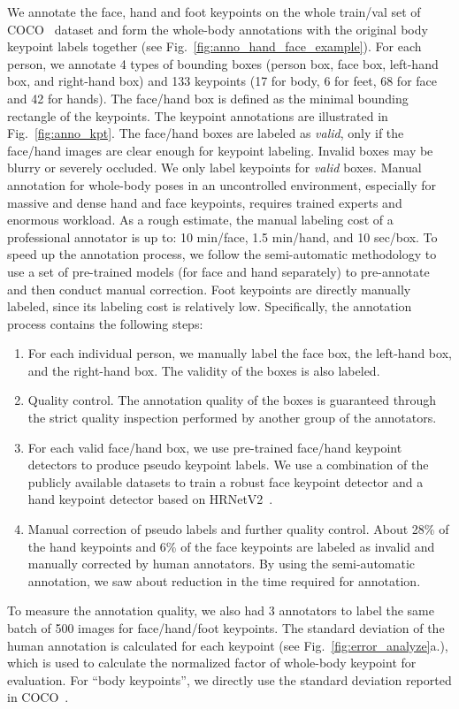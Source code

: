 \documentclass[runningheads]{llncs}
\begin{document}
	We annotate the face, hand and foot keypoints on the whole train/val set of COCO~\cite{lin2014microsoft} dataset and form the whole-body annotations with the original body keypoint labels together (see Fig.~\ref{fig:anno_hand_face_example}). For each person, we annotate 4 types of bounding boxes (person box, face box, left-hand box, and right-hand box) and 133 keypoints (17 for body, 6 for feet, 68 for face and 42 for hands). The face/hand box is defined as the minimal bounding rectangle of the keypoints. The keypoint annotations are illustrated in Fig.~\ref{fig:anno_kpt}. The face/hand boxes are labeled as \emph{valid}, only if the face/hand images are clear enough for keypoint labeling. Invalid boxes may be blurry or severely occluded. We only label keypoints for \emph{valid} boxes. Manual annotation for whole-body poses in an uncontrolled environment, especially for massive and dense hand and face keypoints, requires trained experts and enormous workload. As a rough estimate, the manual labeling cost of a professional annotator is up to: 10 min/face, 1.5 min/hand, and 10 sec/box. To speed up the annotation process, we follow the semi-automatic methodology to use a set of pre-trained models (for face and hand separately) to pre-annotate and then conduct manual correction. Foot keypoints are directly manually labeled, since its labeling cost is relatively low. Specifically, the annotation process contains the following steps:
	\begin{enumerate}
		\item For each individual person, we manually label the face box, the left-hand box, and the right-hand box. The validity of the boxes is also labeled.
		\item Quality control. The annotation quality of the boxes is guaranteed through the strict quality inspection performed by another group of the annotators.
		\item For each valid face/hand box, we use pre-trained face/hand keypoint detectors to produce pseudo keypoint labels. We use a combination of the publicly available datasets to train a robust face keypoint detector and a hand keypoint detector based on HRNetV2~\cite{sun2019deep}.
		\item Manual correction of pseudo labels and further quality control. About 28\% of the hand keypoints and 6\% of the face keypoints are labeled as invalid and manually corrected by human annotators. By using the semi-automatic annotation, we saw about  reduction in the time required for annotation. 
	\end{enumerate}
	To measure the annotation quality, we also had 3 annotators to label the same batch of 500 images for face/hand/foot keypoints. The standard deviation of the human annotation is calculated for each keypoint (see Fig.~\ref{fig:error_analyze}a.), which is used to calculate the normalized factor of whole-body keypoint for evaluation. For ``body keypoints'', we directly use the standard deviation reported in COCO~\cite{lin2014microsoft}. 
	
\end{document}
